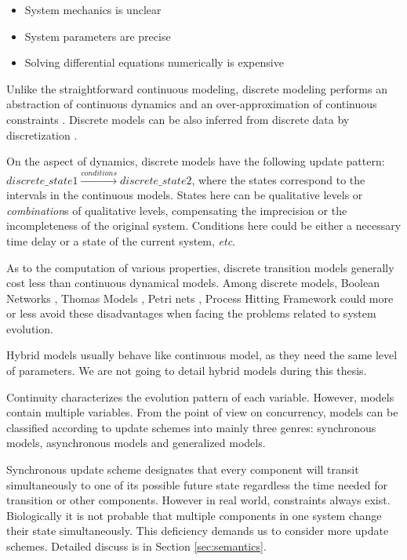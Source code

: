 \begin{itemize}
    \item System mechanics is unclear
    \item System parameters are precise 
    \item Solving differential equations numerically is expensive 
\end{itemize}

Unlike the straightforward continuous modeling, discrete modeling performs an abstraction of continuous dynamics and an over-approximation of continuous constraints \cite{bernot2009}.
Discrete models can be also inferred from discrete data by discretization \cite{dimitrova2006polynomial}.

On the aspect of dynamics, discrete models have the following update pattern: $discrete\_state1\xrightarrow{conditions}discrete\_state2$, where the states correspond to the intervals in the continuous models. 
States here can be qualitative levels or \textit{combination}s of qualitative levels, compensating the imprecision or the incompleteness of the original system.
Conditions here could be either a necessary time delay or a state of the current system, \textit{etc}.

As to the computation of various properties, discrete transition models generally cost less than continuous dynamical models.
Among discrete models, Boolean Networks \cite{kauffman1969}, Thomas Models \cite{thomas1978}, Petri nets \cite{pinney2003petri}, Process Hitting Framework \cite{pauleve2011} could more or less avoid these disadvantages when facing the problems related to system evolution.

Hybrid models \cite{wang2015sreach,lincoln2004symbolic,singhania2011hybrid} usually behave like continuous model, as they need the same level of parameters.
We are not going to detail hybrid models during this thesis.

Continuity characterizes the evolution pattern of each variable.
However, models contain multiple variables.
From the point of view on concurrency, models can be classified according to update schemes into mainly three genres: synchronous models, asynchronous models and generalized models.

Synchronous update scheme designates that every component will transit simultaneously to one of its possible future state regardless the time needed for transition or other components.
However in real world, constraints always exist.
Biologically it is not probable that multiple components in one system change their state simultaneously.
This deficiency demands us to consider more update schemes.
Detailed discuss is in Section \ref{sec:semantics}.

